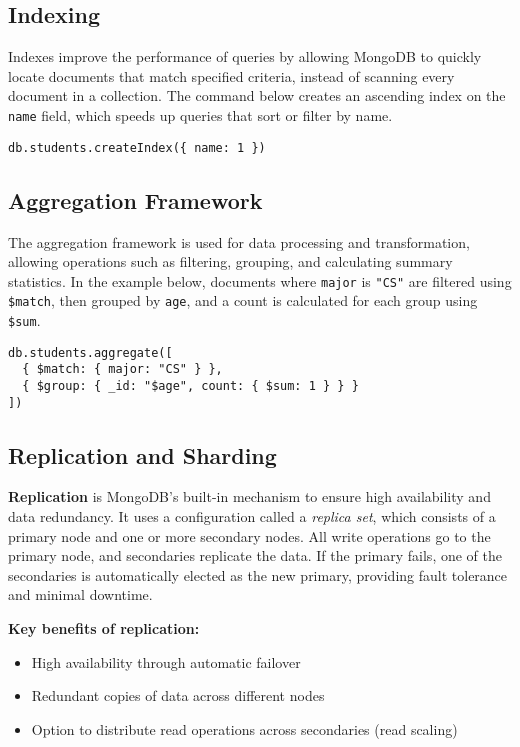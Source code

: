 \documentclass{article}
\begin{document}
\subsection{Indexing}
Indexes improve the performance of queries by allowing MongoDB to quickly locate documents that match specified criteria, instead of scanning every document in a collection. The command below creates an ascending index on the \texttt{name} field, which speeds up queries that sort or filter by name.

\begin{verbatim}
db.students.createIndex({ name: 1 })
\end{verbatim}

\subsection{Aggregation Framework}
The aggregation framework is used for data processing and transformation, allowing operations such as filtering, grouping, and calculating summary statistics. In the example below, documents where \texttt{major} is \texttt{"CS"} are filtered using \texttt{\$match}, then grouped by \texttt{age}, and a count is calculated for each group using \texttt{\$sum}.

\begin{verbatim}
db.students.aggregate([
  { $match: { major: "CS" } },
  { $group: { _id: "$age", count: { $sum: 1 } } }
])
\end{verbatim}


\subsection{Replication and Sharding}

\textbf{Replication} is MongoDB’s built-in mechanism to ensure high availability and data redundancy. It uses a configuration called a \textit{replica set}, which consists of a primary node and one or more secondary nodes. All write operations go to the primary node, and secondaries replicate the data. If the primary fails, one of the secondaries is automatically elected as the new primary, providing fault tolerance and minimal downtime.

\textbf{Key benefits of replication:}
\begin{itemize}
    \item High availability through automatic failover
    \item Redundant copies of data across different nodes
    \item Option to distribute read operations across secondaries (read scaling)
\end{itemize}
\end{document}
